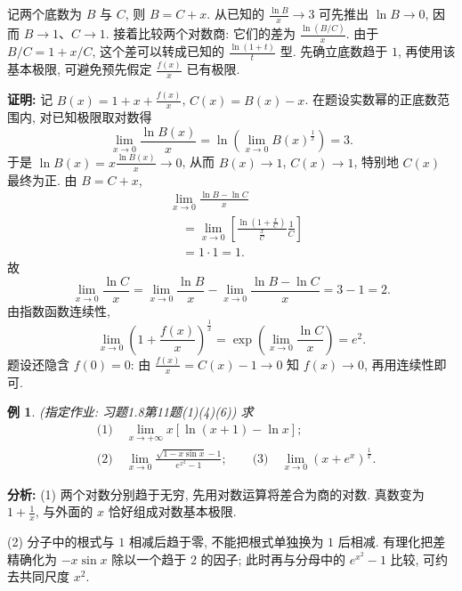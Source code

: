 \documentclass[UTF8,openany]{ctexbook}
\theoremstyle{chinesetextbook}
\newtheorem{example}{例}[section]
\newenvironment{cnproof}{\par\indent\textbf{证明:} \ignorespaces}{\par}
\begin{document}
记两个底数为 $B$ 与 $C$, 则 $B=C+x$. 从已知的 $\displaystyle\frac{\ln B}{x}\to3$ 可先推出 $\ln B\to0$, 因而 $B\to1$、$C\to1$. 接着比较两个对数商: 它们的差为 $\displaystyle\frac{\ln(B/C)}x$. 由于 $\displaystyle B/C=1+x/C$, 这个差可以转成已知的 $\displaystyle\frac{\ln(1+t)}t$ 型. 先确立底数趋于 $1$, 再使用该基本极限, 可避免预先假定 $\displaystyle\frac{f(x)}x$ 已有极限.
\begin{cnproof}
记 $\displaystyle B(x)=1+x+\frac{f(x)}x$, $\displaystyle C(x)=B(x)-x$. 在题设实数幂的正底数范围内, 对已知极限取对数得
\[
\lim_{x\to0}\frac{\ln B(x)}x=\ln\left(\lim_{x\to0}B(x)^{\frac1x}\right)=3.
\]
于是 $\displaystyle\ln B(x)=x\frac{\ln B(x)}x\to0$, 从而 $B(x)\to1$, $C(x)\to1$, 特别地 $C(x)$ 最终为正. 由 $B=C+x$,
\[
\begin{aligned}
&\lim_{x\to0}\frac{\ln B-\ln C}{x}\\
&\quad=\lim_{x\to0}\left[\frac{\ln\left(1+\frac xC\right)}{\frac xC}\frac1C\right]\\
&\quad=1\cdot1=1.
\end{aligned}
\]
故
\[
\lim_{x\to0}\frac{\ln C}x
=\lim_{x\to0}\frac{\ln B}x-\lim_{x\to0}\frac{\ln B-\ln C}x=3-1=2.
\]
由指数函数连续性,
\[
\lim_{x\to0}\left(1+\frac{f(x)}x\right)^{\frac1x}
=\exp\left(\lim_{x\to0}\frac{\ln C}x\right)=e^2.
\] 题设还隐含 $f(0)=0$: 由 $\displaystyle\frac{f(x)}x=C(x)-1\to0$ 知 $f(x)\to0$, 再用连续性即可.
\end{cnproof}
\begin{example}
(指定作业: 习题1.8第11题(1)(4)(6)) 求
\[
\begin{aligned}
&\text{(1)}\quad \lim_{x\to+\infty}x[\ln(x+1)-\ln x];\\
&\text{(2)}\quad \lim_{x\to0}\frac{\sqrt{1-x\sin x}-1}{e^{x^2}-1};\qquad
\text{(3)}\quad \lim_{x\to0}(x+e^x)^{\frac1x}.
\end{aligned}
\]
\end{example}
\par\indent\textbf{分析:} (1) 两个对数分别趋于无穷, 先用对数运算将差合为商的对数. 真数变为 $\displaystyle1+\frac1x$, 与外面的 $x$ 恰好组成对数基本极限.

(2) 分子中的根式与 $1$ 相减后趋于零, 不能把根式单独换为 $1$ 后相减. 有理化把差精确化为 $-x\sin x$ 除以一个趋于 $2$ 的因子; 此时再与分母中的 $e^{x^2}-1$ 比较, 可约去共同尺度 $x^2$.
\end{document}
